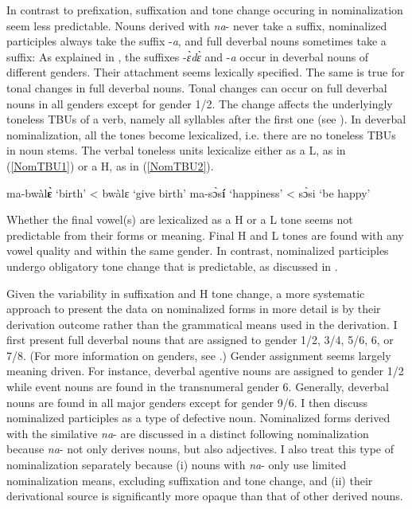 In contrast to prefixation, suffixation and tone change occuring in nominalization seem less predictable. Nouns derived with {\itshape na}- never take a suffix, nominalized participles always take the suffix -{\itshape a}, and full deverbal nouns sometimes take a suffix: As explained in , the suffixes -{\itshape ɛ̀dɛ̀} and -{\itshape a} occur in deverbal nouns of different genders. Their attachment seems lexically specified.
The same is true for tonal changes in full deverbal nouns. Tonal changes can occur on full deverbal nouns in all genders except for gender 1/2.  The change affects the underlyingly toneless TBUs of a verb, namely all syllables after the first one (see ). In deverbal nominalization, all the tones become lexicalized, i.e. there are no toneless TBUs in noun stems. The verbal toneless units lexicalize either as a L, as in (\ref{NomTBU1}) or a H, as in (\ref{NomTBU2}).

\begin{exe}
\ex\label{NomTBU}
\begin{xlist}
\ex\label{NomTBU1} ma-bwàl{\bfseries ɛ̀ }`birth' < bwàlɛ `give birth'
\ex\label{NomTBU2} ma-sɔ̀s{\bfseries í }`happiness' < sɔ̀si `be happy'
\end{xlist}
\end{exe}

\noindent Whether the final vowel(s) are lexicalized as a H or a L tone seems not predictable from their forms or meaning. Final H and L tones are found with any vowel quality and within the same gender. In contrast, nominalized participles undergo obligatory tone change that is predictable, as discussed in . 

Given the variability in suffixation and H tone change, a more systematic approach to present the data on nominalized forms in more detail is by their derivation outcome rather than the grammatical means used in the derivation. I first present full deverbal nouns that are assigned to gender 1/2, 3/4, 5/6, 6, or 7/8.    
(For more information on genders, see .) Gender assignment seems largely meaning driven. For instance, deverbal agentive nouns are assigned to gender 1/2 while event nouns are found in the transnumeral gender 6. Generally, deverbal nouns are found in all major genders except for gender 9/6. I then discuss nominalized participles as a type of defective noun. Nominalized forms derived with the similative {\itshape na}- are discussed in a distinct  following nominalization because {\itshape na}-  not only derives nouns, but also adjectives. I also treat this type of nominalization separately because (i) nouns with {\itshape na}- only use limited nominalization means, excluding suffixation and tone change,  and (ii) their derivational source is significantly more opaque than that of other derived nouns.



